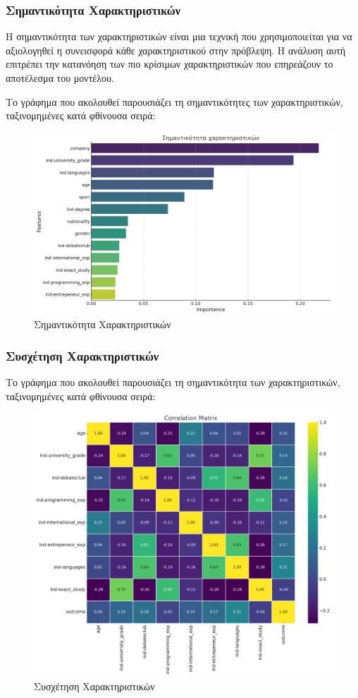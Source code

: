\documentclass[12pt,twoside]{article}
\begin{document}
\subsubsection{Σημαντικότητα Χαρακτηριστικών}

Η σημαντικότητα των χαρακτηριστικών είναι μια τεχνική που χρησιμοποιείται για να αξιολογηθεί η συνεισφορά κάθε χαρακτηριστικού στην πρόβλεψη. Η ανάλυση αυτή επιτρέπει την κατανόηση των πιο κρίσιμων χαρακτηριστικών που επηρεάζουν το αποτέλεσμα του μοντέλου.

 Το γράφημα που ακολουθεί παρουσιάζει τη σημαντικότητες των χαρακτηριστικών, ταξινομημένες κατά φθίνουσα σειρά:
\begin{figure}[H]
\centering
\includegraphics[width=170mm]{feature_importance.png}
    \caption{Σημαντικότητα Χαρακτηριστικών}
    \label{fig:feature_importance}
\end{figure}

\subsubsection{Συσχέτηση Χαρακτηριστικών}

 Το γράφημα που ακολουθεί παρουσιάζει τη σημαντικότητα των χαρακτηριστικών, ταξινομημένες κατά φθίνουσα σειρά:
\begin{figure}[H]
\centering
\includegraphics[width=120mm]{correlation_matrix.png}
    \caption{Συσχέτηση Χαρακτηριστικών}
    \label{fig:correlation_matrix}
\end{figure}
\end{document}
